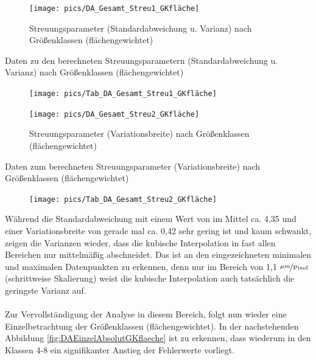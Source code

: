 \documentclass[
fontsize=10pt, 
listof = totoc,
parskip = half	
]{report}
\begin{document}
\begin{figure}[H]
	\centering
	\texttt{[image: pics/DA\_Gesamt\_Streu1\_GKfläche]}
	\caption{Streuungsparameter (Standardabweichung u. Varianz) nach Größenklassen (flächengewichtet)}
	\label{fig:DAGesamtStreu1GKfläche}
\end{figure}

\begin{table}[H]
	\caption{Daten zu den berechneten Streuungsparametern (Standardabweichung u. Varianz) nach Größenklassen (flächengewichtet)}
	\label{tab:DAGesamtStreu1GKflaeche}
	\begin{figure}[H]
		\centering
		\texttt{[image: pics/Tab\_DA\_Gesamt\_Streu1\_GKfläche]}
	\end{figure}
\end{table}

\begin{figure}[H]
	\centering
	\texttt{[image: pics/DA\_Gesamt\_Streu2\_GKfläche]}
	\caption{Streuungsparameter (Variationsbreite) nach Größenklassen (flächengewichtet)}
	\label{fig:DAGesamtStreu2GKfläche}
\end{figure}

\begin{table}[H]
	\caption{Daten zum berechneten Streuungsparameter (Variationsbreite) nach Größenklassen (flächengewichtet)}
	\label{tab:DAGesamtStreu2GKflaeche}
	\begin{figure}[H]
		\centering
		\texttt{[image: pics/Tab\_DA\_Gesamt\_Streu2\_GKfläche]}
	\end{figure}
\end{table}

\noindent Während die Standardabweichung mit einem Wert von im Mittel ca. 4,35 und einer Variationsbreite von gerade mal ca. 0,42 sehr gering ist und kaum schwankt, zeigen die Varianzen wieder, dass die kubische Interpolation in fast allen Bereichen nur mittelmäßig abschneidet. Das ist an den eingezeichneten minimalen und maximalen Datenpunkten zu erkennen, denn nur im Bereich von 1,1 $\nicefrac{\mu m}{\text{Pixel}}$ (schrittweise Skalierung) weist die kubische Interpolation auch tatsächlich die geringste Varianz auf.
\\\\
\noindent Zur Vervollständigung der Analyse in diesem Bereich, folgt nun wieder eine Einzelbetrachtung der Größenklassen (flächengewichtet). In der nachstehenden Abbildung \ref{fig:DAEinzelAbsolutGKflaeche} ist zu erkennen, dass wiederum in den Klassen 4-8 ein signifikanter Anstieg der Fehlerwerte vorliegt.
\end{document}
